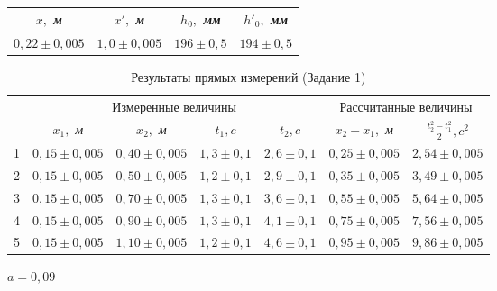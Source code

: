 \documentclass[11pt]{article}
\author{АВТОР}
\date{\today}
\title{}
\begin{document}
\begin{table}[htb]
\centering
\large
\caption{}
\begin{tabular}{|c|c|c|c|}
		\hline
		$x,$ \textit{м} & $x',$ \textit{м} & $h_0,$ \textit{мм}  & $h'_0,$ \textit{мм}\\
		\hline
		$0,22 \pm 0,005$& $1,0 \pm 0,005$& $196\pm 0,5$ &$ 194 \pm 0,5$\\
		\hline
	\end{tabular}
\end{table}
\begin{table}[htb]
	\caption{Результаты прямых измерений (Задание 1)}
	\centering
	\large
	\begin{tabular}{|c|c|c|c|c|c|c|}
		\hline
		\multirow{2}{*}{\textnumero} & \multicolumn{4}{c}{Измеренные величины} & \multicolumn{2}{|c|}{Рассчитанные величины}\\
		\cline{2-7}
						      & $x_1,$ \textit{м}  & $x_2,$ \textit{м}  & $t_1, c$  & $t_2, c$   & $x_2 - x_1, $ \textit{м} & $\frac{t^2_{2} - t^2_1}{2}, c^2$\\
		\hline
		1 & $0,15 \pm 0,005$ & $0,40 \pm 0,005$ & $1,3 \pm 0,1$ & $2,6 \pm 0,1$ & $0,25 \pm 0,005$ & $2,54  \pm 0,005$\\
		\hline
		2 & $0,15 \pm 0,005$ & $0,50 \pm 0,005$ & $1,2 \pm 0,1$ & $2,9 \pm 0,1$ & $0,35 \pm 0,005$ & $3,49  \pm 0,005$\\
		\hline
		3 &$0,15 \pm 0,005$ & $0,70 \pm 0,005$ & $1,3 \pm 0,1$& $3,6 \pm 0,1$ & $0,55 \pm 0,005$ & $5,64  \pm 0,005$\\
		\hline
		4 & $0,15 \pm 0,005$ & $0,90 \pm 0,005$ & $1,3 \pm 0,1$& $4,1 \pm 0,1$ & $0,75 \pm 0,005$ & $7,56  \pm0,005$\\
		\hline
		5 & $0,15 \pm 0,005$ & $1,10 \pm 0,005$ & $1,2 \pm 0,1$& $4,6 \pm 0,1$ &$0,95 \pm 0,005$  & $9,86  \pm 0,005$\\
		\hline
	\end{tabular}
\end{table}
$a = 0,09$
\end{document}
